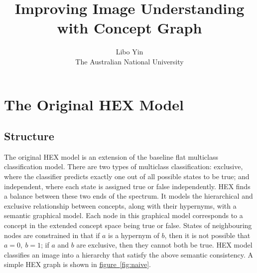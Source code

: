 \documentclass[11pt,a4paper]{article}
\begin{document}
\title{Improving Image Understanding with Concept Graph}
\author{Libo Yin\\The Australian National University}
\maketitle
\section{The Original HEX Model}
\subsection{Structure}

The original HEX model \cite{deng2014large} is an extension of the baseline flat multiclass classification model. There are two types of multiclass classification: exclusive, where the classifier predicts exactly one out of all possible states to be true; and independent, where each state is assigned true or false independently. HEX finds a balance between these two ends of the spectrum. It models the hierarchical and exclusive relationship between concepts, along with their hypernyms, with a semantic graphical model. Each node in this graphical model corresponds to a concept in the extended concept space being true or false. States of neighbouring nodes are constrained in that if $a$ is a hypernym of $b$, then it is not possible that $a=0,\ b=1$; if $a$ and $b$ are exclusive, then they cannot both be true. HEX model classifies an image into a hierarchy that satisfy the above semantic consistency. A simple HEX graph is shown in \hyperref[fig:naive]{figure~\ref{fig:naive}}.
\end{document}
